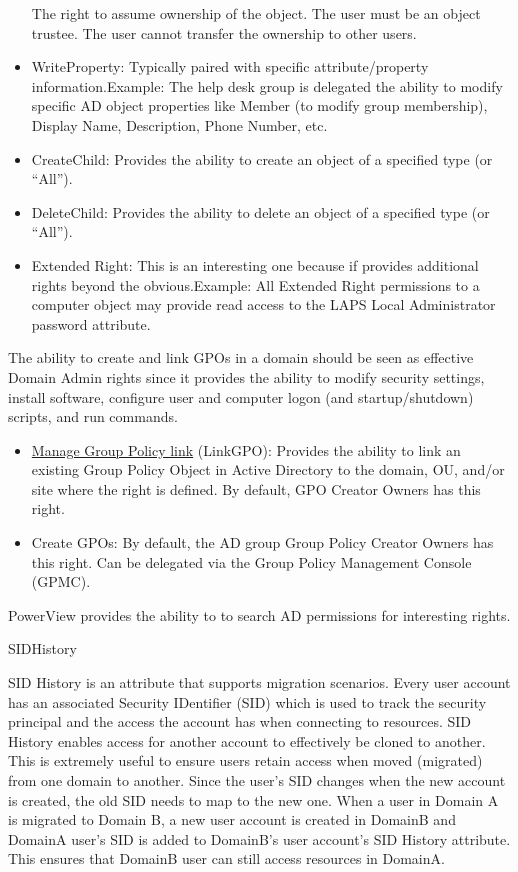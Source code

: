 \begin{itemize}
The right to assume ownership of the object. The user must be an object trustee. The user cannot transfer the ownership to other users.
    \item WriteProperty: Typically paired with specific attribute/property information.Example: The help desk group is delegated the ability to modify specific AD object properties like Member (to modify group membership), Display Name, Description, Phone Number, etc.
    \item CreateChild: Provides the ability to create an object of a specified type (or “All”).
    \item DeleteChild: Provides the ability to delete an object of a specified type (or “All”).
    \item Extended Right: This is an interesting one because if provides additional rights beyond the obvious.Example: All Extended Right permissions to a computer object may provide read access to the LAPS Local Administrator password attribute.
\end{itemize}
The ability to create and link GPOs in a domain should be seen as effective Domain Admin rights since it provides the ability to modify security settings, install software, configure user and computer logon (and startup/shutdown) scripts, and run commands.

\begin{itemize}
    \item \href{https://technet.microsoft.com/en-us/library/cc978262.aspx}{Manage Group Policy link} (LinkGPO): Provides the ability to link an existing Group Policy Object in Active Directory to the domain, OU, and/or site where the right is defined. By default, GPO Creator Owners has this right.
    \item Create GPOs: By default, the AD group Group Policy Creator Owners has this right. Can be delegated via the Group Policy Management Console (GPMC).
\end{itemize}
PowerView provides the ability to to search AD permissions for interesting rights.

SIDHistory

SID History is an attribute that supports migration scenarios. Every user account has an associated Security IDentifier (SID) which is used to track the security principal and the access the account has when connecting to resources. SID History enables access for another account to effectively be cloned to another. This is extremely useful to ensure users retain access when moved (migrated) from one domain to another. Since the user’s SID changes when the new account is created, the old SID needs to map to the new one. When a user in Domain A is migrated to Domain B, a new user account is created in DomainB and DomainA user’s SID is added to DomainB’s user account’s SID History attribute. This ensures that DomainB user can still access resources in DomainA.

